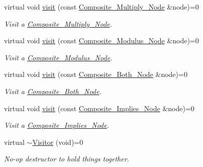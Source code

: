 \begin{DoxyCompactItemize}
virtual void \hyperlink{classMadara_1_1Expression__Tree_1_1Visitor_a250c5147e5631706120652f183d2acaf}{visit} (const \hyperlink{classMadara_1_1Expression__Tree_1_1Composite__Multiply__Node}{Composite\_\-Multiply\_\-Node} \&node)=0
\begin{DoxyCompactList}\small\item\em Visit a \hyperlink{classMadara_1_1Expression__Tree_1_1Composite__Multiply__Node}{Composite\_\-Multiply\_\-Node}. \item\end{DoxyCompactList}\item 
virtual void \hyperlink{classMadara_1_1Expression__Tree_1_1Visitor_a7715d370880e4bf5c3e25051bfd4133d}{visit} (const \hyperlink{classMadara_1_1Expression__Tree_1_1Composite__Modulus__Node}{Composite\_\-Modulus\_\-Node} \&node)=0
\begin{DoxyCompactList}\small\item\em Visit a \hyperlink{classMadara_1_1Expression__Tree_1_1Composite__Modulus__Node}{Composite\_\-Modulus\_\-Node}. \item\end{DoxyCompactList}\item 
virtual void \hyperlink{classMadara_1_1Expression__Tree_1_1Visitor_a2389827a51a465fd3c3025084111173e}{visit} (const \hyperlink{classMadara_1_1Expression__Tree_1_1Composite__Both__Node}{Composite\_\-Both\_\-Node} \&node)=0
\begin{DoxyCompactList}\small\item\em Visit a \hyperlink{classMadara_1_1Expression__Tree_1_1Composite__Both__Node}{Composite\_\-Both\_\-Node}. \item\end{DoxyCompactList}\item 
virtual void \hyperlink{classMadara_1_1Expression__Tree_1_1Visitor_a1dc5f69864ddaba89a5517a3f87a6907}{visit} (const \hyperlink{classMadara_1_1Expression__Tree_1_1Composite__Implies__Node}{Composite\_\-Implies\_\-Node} \&node)=0
\begin{DoxyCompactList}\small\item\em Visit a \hyperlink{classMadara_1_1Expression__Tree_1_1Composite__Implies__Node}{Composite\_\-Implies\_\-Node}. \item\end{DoxyCompactList}\item 
virtual \hyperlink{classMadara_1_1Expression__Tree_1_1Visitor_a55d0ee22ede05c41c18482f03b2ee42e}{$\sim$Visitor} (void)=0
\begin{DoxyCompactList}\small\item\em No-\/op destructor to hold things together. \item\end{DoxyCompactList}\end{DoxyCompactItemize}


